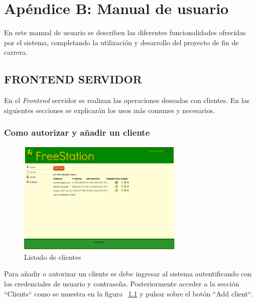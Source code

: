     \cleardoublepage
    
    \chapter{Apéndice B: Manual de usuario}

    En este manual de usuario se describen las diferentes funcionalidades 
    ofrecidas por el sistema, completando la
    utilización y desarrollo del proyecto de fin de carrera.
    
    \section{\uppercase{Frontend servidor}}

    En el \emph{Frontend} servidor se realizan las operaciones deseadas con
    clientes. En las siguientes secciones se explicarán los usos más comunes y necesarios.
    
    \subsection{Como autorizar y añadir un cliente}
    
    \begin{figure}[ht]
        \begin{center}
            \includegraphics[width=300px]{src/img/freestation-server-clients.png}
            \caption[Listado de clientes]
              {Listado de clientes}
             \label{fig:listclients}
        \end{center}
    \end{figure}
    
    \newpage
    Para añadir o autorizar un cliente se debe ingresar al sistema
    autentificando con los credenciales de usuario y contraseña. Posteriormente
    acceder a la sección ``Clients`` como se muestra en la figura
    ~\ref{fig:listclients} y pulsar sobre el botón ``Add client``.


